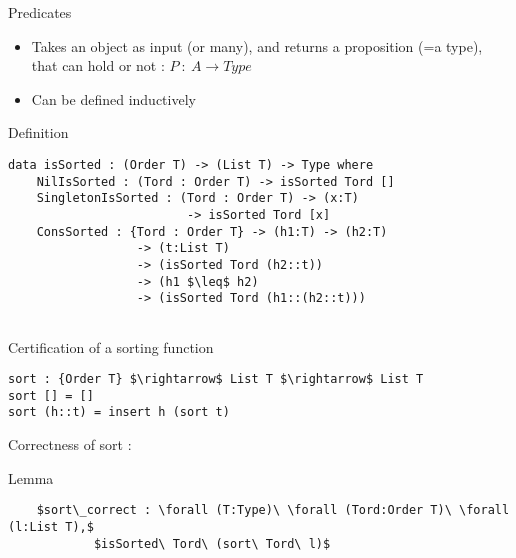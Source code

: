 \documentclass[french]{beamer}
\begin{document}
\begin{frame}[fragile]{Predicates}
	\begin{itemize}
		\item Takes an object as input (or many), and returns a proposition (=a type), that can hold or not : $P\ :\ A \rightarrow Type$
		\item Can be defined inductively
		
	\end{itemize}		

\begin{block}{Definition}

	\begin{lstlisting}
data isSorted : (Order T) -> (List T) -> Type where
    NilIsSorted : (Tord : Order T) -> isSorted Tord []
    SingletonIsSorted : (Tord : Order T) -> (x:T) 
                         -> isSorted Tord [x]
    ConsSorted : {Tord : Order T} -> (h1:T) -> (h2:T) 
                  -> (t:List T) 
                  -> (isSorted Tord (h2::t)) 
                  -> (h1 $\leq$ h2)
                  -> (isSorted Tord (h1::(h2::t))) 
      
	\end{lstlisting}
	
\end{block}

\end{frame}



\begin{frame}[fragile]{Certification of a sorting function}

\begin{lstlisting}
sort : {Order T} $\rightarrow$ List T $\rightarrow$ List T  
sort [] = []
sort (h::t) = insert h (sort t)
\end{lstlisting}

Correctness of sort :
\begin{alertblock}{Lemma}
	\begin{lstlisting}
	$sort\_correct : \forall (T:Type)\ \forall (Tord:Order T)\ \forall (l:List T),$
            $isSorted\ Tord\ (sort\ Tord\ l)$
      
	\end{lstlisting}
\end{alertblock}

\end{frame}
\end{document}

